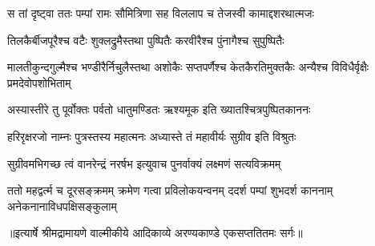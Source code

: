 \twolineshloka
{स तां दृष्ट्वा ततः पम्पां रामः सौमित्रिणा सह}
{विललाप च तेजस्वी कामाद्दशरथात्मजः} %

\twolineshloka
{तिलकैर्बीजपूरैश्च वटैः शुक्लद्रुमैस्तथा}
{पुष्पितैः करवीरैश्च पुंनागैश्च सुपुष्पितैः} %

\threelineshloka
{मालतीकुन्दगुल्मैश्च भण्डीरैर्निचुलैस्तथा}
{अशोकैः सप्तपर्णैश्च केतकैरतिमुक्तकैः}
{अन्यैश्च विविधैर्वृक्षैः प्रमदेवोपशोभिताम्} %

\twolineshloka
{अस्यास्तीरे तु पूर्वोक्तः पर्वतो धातुमण्डितः}
{ऋश्यमूक इति ख्यातश्चित्रपुष्पितकाननः} %

\twolineshloka
{हरिरृक्षरजो नाम्नः पुत्रस्तस्य महात्मनः}
{अध्यास्ते तं महावीर्यः सुग्रीव इति विश्रुतः} %

\twolineshloka
{सुग्रीवमभिगच्छ त्वं वानरेन्द्रं नरर्षभ}
{इत्युवाच पुनर्वाक्यं लक्ष्मणं सत्यविक्रमम्} %

\fourlineindentedshloka
{ततो महद्वर्त्म च दूरसङ्क्रमम्}
{क्रमेण गत्वा प्रविलोकयन्वनम्}
{ददर्श पम्पां शुभदर्श काननाम्}
{अनेकनानाविधपक्षिसङ्कुलाम्} %


{॥इत्यार्षे श्रीमद्रामायणे वाल्मीकीये आदिकाव्ये अरण्यकाण्डे एकसप्ततितमः सर्गः॥}

